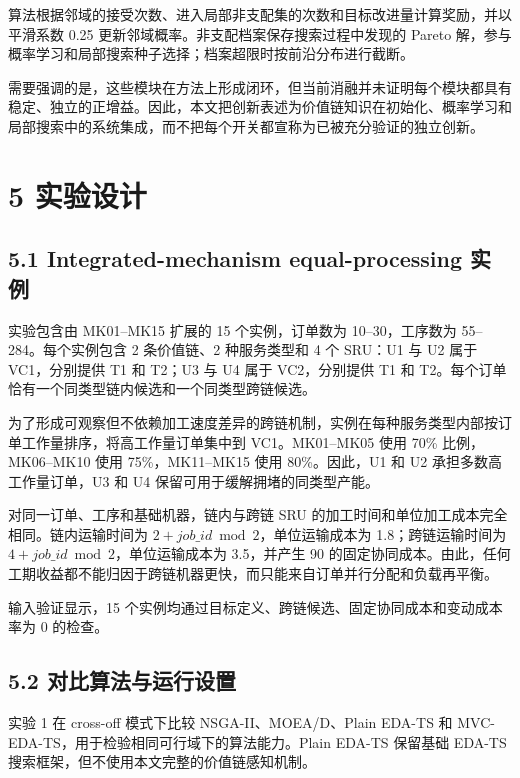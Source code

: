 \documentclass[UTF8,11pt]{ctexart}
\begin{document}
算法根据邻域的接受次数、进入局部非支配集的次数和目标改进量计算奖励，并以平滑系数 0.25 更新邻域概率。非支配档案保存搜索过程中发现的 Pareto 解，参与概率学习和局部搜索种子选择；档案超限时按前沿分布进行截断。

需要强调的是，这些模块在方法上形成闭环，但当前消融并未证明每个模块都具有稳定、独立的正增益。因此，本文把创新表述为价值链知识在初始化、概率学习和局部搜索中的系统集成，而不把每个开关都宣称为已被充分验证的独立创新。

\section*{5 实验设计}

\subsection*{5.1 Integrated-mechanism equal-processing 实例}

实验包含由 MK01–MK15 扩展的 15 个实例，订单数为 10–30，工序数为 55–284。每个实例包含 2 条价值链、2 种服务类型和 4 个 SRU：U1 与 U2 属于 VC1，分别提供 T1 和 T2；U3 与 U4 属于 VC2，分别提供 T1 和 T2。每个订单恰有一个同类型链内候选和一个同类型跨链候选。

为了形成可观察但不依赖加工速度差异的跨链机制，实例在每种服务类型内部按订单工作量排序，将高工作量订单集中到 VC1。MK01–MK05 使用 70\% 比例，MK06–MK10 使用 75\%，MK11–MK15 使用 80\%。因此，U1 和 U2 承担多数高工作量订单，U3 和 U4 保留可用于缓解拥堵的同类型产能。

对同一订单、工序和基础机器，链内与跨链 SRU 的加工时间和单位加工成本完全相同。链内运输时间为 \(2+job\_id\bmod2\)，单位运输成本为 1.8；跨链运输时间为 \(4+job\_id\bmod2\)，单位运输成本为 3.5，并产生 90 的固定协同成本。由此，任何工期收益都不能归因于跨链机器更快，而只能来自订单并行分配和负载再平衡。

输入验证显示，15 个实例均通过目标定义、跨链候选、固定协同成本和变动成本率为 0 的检查。

\subsection*{5.2 对比算法与运行设置}

实验 1 在 cross-off 模式下比较 NSGA-II、MOEA/D、Plain EDA-TS 和 MVC-EDA-TS，用于检验相同可行域下的算法能力。Plain EDA-TS 保留基础 EDA-TS 搜索框架，但不使用本文完整的价值链感知机制。
\end{document}
